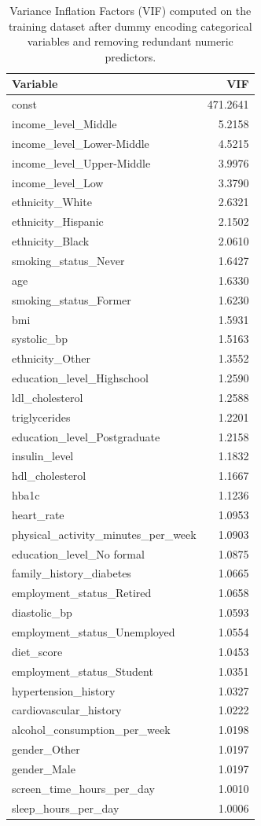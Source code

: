 \begin{table}[H]
\begin{center}
\begin{tabular}{lr}
\toprule
Variable & VIF \\
\midrule
const & 471.2641 \\
income\_level\_Middle & 5.2158 \\
income\_level\_Lower-Middle & 4.5215 \\
income\_level\_Upper-Middle & 3.9976 \\
income\_level\_Low & 3.3790 \\
ethnicity\_White & 2.6321 \\
ethnicity\_Hispanic & 2.1502 \\
ethnicity\_Black & 2.0610 \\
smoking\_status\_Never & 1.6427 \\
age & 1.6330 \\
smoking\_status\_Former & 1.6230 \\
bmi & 1.5931 \\
systolic\_bp & 1.5163 \\
ethnicity\_Other & 1.3552 \\
education\_level\_Highschool & 1.2590 \\
ldl\_cholesterol & 1.2588 \\
triglycerides & 1.2201 \\
education\_level\_Postgraduate & 1.2158 \\
insulin\_level & 1.1832 \\
hdl\_cholesterol & 1.1667 \\
hba1c & 1.1236 \\
heart\_rate & 1.0953 \\
physical\_activity\_minutes\_per\_week & 1.0903 \\
education\_level\_No formal & 1.0875 \\
family\_history\_diabetes & 1.0665 \\
employment\_status\_Retired & 1.0658 \\
diastolic\_bp & 1.0593 \\
employment\_status\_Unemployed & 1.0554 \\
diet\_score & 1.0453 \\
employment\_status\_Student & 1.0351 \\
hypertension\_history & 1.0327 \\
cardiovascular\_history & 1.0222 \\
alcohol\_consumption\_per\_week & 1.0198 \\
gender\_Other & 1.0197 \\
gender\_Male & 1.0197 \\
screen\_time\_hours\_per\_day & 1.0010 \\
sleep\_hours\_per\_day & 1.0006 \\
\bottomrule
\end{tabular}
\end{center}
\vspace{-5pt}
\caption{Variance Inflation Factors (VIF) computed on the training dataset after dummy encoding categorical variables and removing redundant numeric predictors.}
\label{tab:vif_train_full_model}
\end{table}
